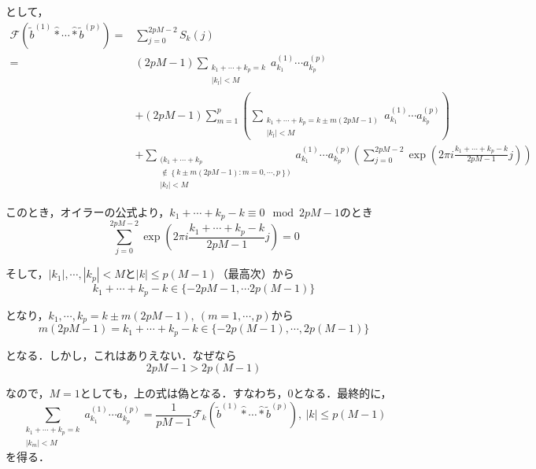 \documentclass[11pt,a4paper]{jsarticle}
\theoremstyle{definition}
\begin{document}
\begin{description}
    として，
    \begin{align*}
      \mathcal{F}\left(\tilde{b}^{(1)} \hat* \cdots \hat* \tilde{b}^{(p)}\right) = & \sum_{j=0}^{2pM-2} S_k(j)                                                     \\
      =                                                                            & (2pM-1) \sum_{\substack{{k_1+\cdots+k_p=k}                                    \\ {|k_l|<M}}} a_{k_1}^{(1)}\cdots a_{k_p}^{(p)} \\
                                                                                   & + (2pM-1) \sum_{m=1}^{p} \left( \sum_{\substack{k_1+\cdots+k_p=k \pm m(2pM-1) \\ |k_l|<M}} a_{k_1}^{(1)} \cdots a_{k_p}^{(p)} \right)  \\
                                                                                   & +  \sum_{\substack{( k_1+\cdots+k_p                                           \\ \notin \left\{ k \pm m(2pM-1) :m=0,\cdots,p\right\} ) \\ |k_l|<M}} a_{k_1}^{(1)} \cdots a_{k_p}^{(p)} \left( \sum_{j=0}^{2pM-2} \exp \left( 2\pi i \frac{k_1+\cdots+k_p-k}{2pM-1}j \right)\right)
    \end{align*}

    このとき，オイラーの公式より，$k_1+\cdots+k_p-k \equiv 0 \mod 2pM-1$のとき
    \begin{equation*}
      \sum_{j=0}^{2pM-2} \exp(2\pi i \frac{k_1+\cdots+k_p-k}{2pM-1}j) = 0
    \end{equation*}

    そして，$|k_1|,\cdots,|k_p|<M$と$|k|\leq p(M-1)$（最高次）から
    \begin{equation*}
      k_1+\cdots+k_p-k \in \{ -2pM-1, \cdots 2p(M-1) \}
    \end{equation*}

    となり，$k_1,\cdots,k_p = k \pm m(2pM-1),\ (m=1,\cdots, p)$から
    \begin{equation*}
      m(2pM-1) = k_1 + \cdots + k_p - k \in \{ -2p(M-1),\cdots, 2p(M-1)\}
    \end{equation*}

    となる．しかし，これはありえない．なぜなら
    \begin{equation*}
      2pM-1 > 2p(M-1)
    \end{equation*}

    なので，$M=1$としても，上の式は偽となる．すなわち，$0$となる．最終的に，
    \begin{equation*}
      \sum_{\substack{k_1+\cdots+k_p=k \\ |k_m|<M}} a_{k_1}^{(1)}\cdots a_{k_p}^{(p)} = \frac{1}{pM-1}\mathcal{F}_k(\tilde{b}^{(1)} \hat* \cdots \hat* \tilde{b}^{(p)}),\ |k|\leq p(M-1)
    \end{equation*}
    を得る．
\end{description}
\end{document}
